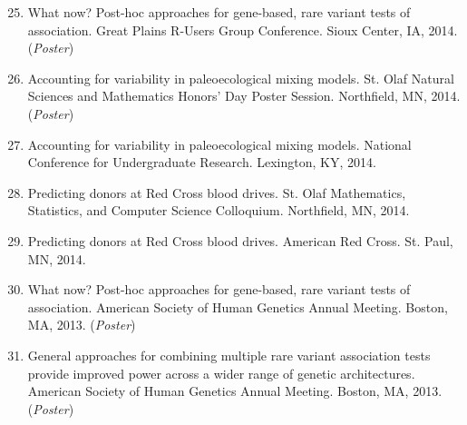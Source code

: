 \documentclass[margin]{res}
\newenvironment{benumerate}[1]{
    \let\oldItem\item
    \def\item{\addtocounter{enumi}{-2}\oldItem}
    
    \begin{enumerate}
    \setcounter{enumi}{#1}
    \addtocounter{enumi}{1}
}{
    \end{enumerate}
}
\begin{document}
\begin{resume}
\begin{benumerate}{24}
\item %
What now? Post-hoc approaches for gene-based, rare variant tests of association. Great Plains R-Users Group Conference. Sioux Center, IA, 2014. (\textit{Poster})

\item %
Accounting for variability in paleoecological mixing models. St. Olaf Natural Sciences and Mathematics Honors’ Day Poster Session. Northfield, MN, 2014. (\textit{Poster})


\item %
Accounting for variability in paleoecological mixing models. National Conference for Undergraduate Research. Lexington, KY, 2014.

\item %
Predicting donors at Red Cross blood drives. St. Olaf Mathematics, Statistics, and Computer Science Colloquium. Northfield, MN, 2014.

\item %
Predicting donors at Red Cross blood drives. American Red Cross. St. Paul, MN, 2014.


\item %
What now? Post-hoc approaches for gene-based, rare variant tests of association. American Society of Human Genetics Annual Meeting. Boston, MA, 2013. (\textit{Poster})

\item %
General approaches for combining multiple rare variant association tests provide improved power across a wider range of genetic architectures. American Society of Human Genetics Annual Meeting. Boston, MA, 2013. (\textit{Poster}) \\
\end{benumerate}


\end{resume}
\end{document}
